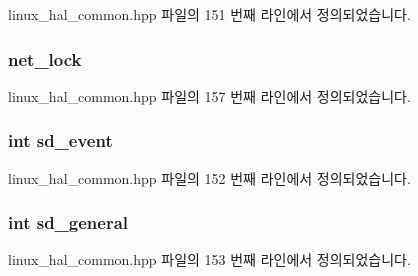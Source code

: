 linux\+\_\+hal\+\_\+common.\+hpp 파일의 151 번째 라인에서 정의되었습니다.

\subsubsection[{\texorpdfstring{net\+\_\+lock}{net_lock}}]{ net\+\_\+lock\hspace{0.3cm}{\ttfamily [private]}}\hypertarget{class_linux_network_interface_a2485d8ad81138164119a9e8b68642a1d}{}\label{class_linux_network_interface_a2485d8ad81138164119a9e8b68642a1d}


linux\+\_\+hal\+\_\+common.\+hpp 파일의 157 번째 라인에서 정의되었습니다.

\subsubsection[{\texorpdfstring{sd\+\_\+event}{sd_event}}]{\setlength{\rightskip}{0pt plus 5cm}int sd\+\_\+event\hspace{0.3cm}{\ttfamily [private]}}\hypertarget{class_linux_network_interface_ab2e41169dafb40e1ab917422a2d1145a}{}\label{class_linux_network_interface_ab2e41169dafb40e1ab917422a2d1145a}


linux\+\_\+hal\+\_\+common.\+hpp 파일의 152 번째 라인에서 정의되었습니다.

\subsubsection[{\texorpdfstring{sd\+\_\+general}{sd_general}}]{\setlength{\rightskip}{0pt plus 5cm}int sd\+\_\+general\hspace{0.3cm}{\ttfamily [private]}}\hypertarget{class_linux_network_interface_a4dac986db2725a7381738a799374da65}{}\label{class_linux_network_interface_a4dac986db2725a7381738a799374da65}


linux\+\_\+hal\+\_\+common.\+hpp 파일의 153 번째 라인에서 정의되었습니다.


